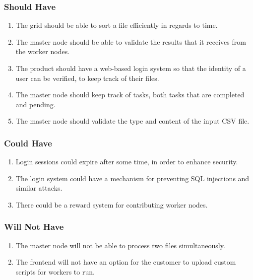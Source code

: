 \subsubsection{Should Have}
\begin{enumerate}
    \item The grid should be able to sort a file efficiently in regards to time.
    \item The master node should be able to validate the results that it receives from the worker nodes.
    \item The product should have a web-based login system so that the identity of a user can be verified, to keep track of their files.
    \item The master node should keep track of tasks, both tasks that are completed and pending.
    \item The master node should validate the type and content of the input CSV file.
\end{enumerate}

\subsubsection{Could Have}
\begin{enumerate}
    \item Login sessions could expire after some time, in order to enhance security.
    \item The login system could have a mechanism for preventing SQL injections and similar attacks.
    \item There could be a reward system for contributing worker nodes.
\end{enumerate}

\subsubsection{Will Not Have}
\begin{enumerate}
    \item The master node will not be able to process two files simultaneously.
    \item The frontend will not have an option for the customer to upload custom scripts for workers to run.
\end{enumerate}
